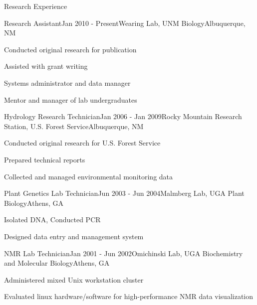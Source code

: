 \documentclass{resume} %
\begin{document}
\begin{rSection}{Research Experience}
\begin{rSubsection}{Research Assistant}{Jan 2010 - Present}{Wearing Lab, UNM Biology}{Albuquerque, NM}
\item Conducted original research for publication
\item Assisted with grant writing
\item Systems administrator and data manager
\item Mentor and manager of lab undergraduates
\end{rSubsection}


\begin{rSubsection}{Hydrology Research Technician}{Jan 2006 - Jan 2009}{Rocky
Mountain Research Station, U.S. Forest Service}{Albuquerque, NM}
\item Conducted original research for U.S. Forest Service
\item Prepared technical reports
\item Collected and managed environmental monitoring data 
\end{rSubsection}

\begin{rSubsection}{Plant Genetics Lab Technician}{Jun 2003 - Jun 2004}{Malmberg Lab, UGA Plant Biology}{Athens, GA}
\item Isolated DNA, Conducted PCR
\item Designed data entry and management system
\end{rSubsection}

\begin{rSubsection}{NMR Lab Technician}{Jan 2001 - Jun 2002}{Omichinski Lab, UGA
Biochemistry and Molecular Biology}{Athens, GA}
\item Administered mixed Unix workstation cluster
\item Evaluated linux hardware/software for high-performance NMR data
visualization
\end{rSubsection}
\end{rSection}



\clearpage
\end{document}
